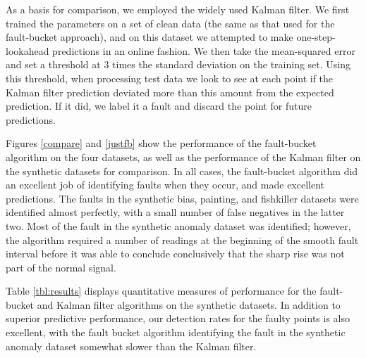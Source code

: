 \documentclass{article}
\begin{document}
As a basis for comparison, we employed the widely used Kalman
filter. We first trained the parameters on a set of clean data (the
same as that used for the fault-bucket approach), and on this dataset
we attempted to make one-step-lookahead predictions in an online
fashion. We then take the mean-squared error and set a threshold at 3
times the standard deviation on the training set. Using this
threshold, when processing test data we look to see at each point if
the Kalman filter prediction deviated more than this amount from the
expected prediction. If it did, we label it a fault and discard the
point for future predictions.

Figures \ref{compare} and \ref{justfb} show the performance of the
fault-bucket algorithm on the four datasets, as well as the
performance of the Kalman filter on the synthetic datasets for
comparison.  In all cases, the fault-bucket algorithm did an excellent
job of identifying faults when they occur, and made excellent
predictions.  The faults in the synthetic bias, painting,
and fishkiller datasets were identified almost perfectly, with a small
number of false negatives in the latter two.  Most of the fault in the
synthetic anomaly dataset was identified; however, the algorithm
required a number of readings at the beginning of the smooth fault
interval before it was able to conclude conclusively that the sharp
rise was not part of the normal signal.

Table \ref{tbl:results} displays quantitative measures of performance
for the fault-bucket and Kalman filter algorithms on the synthetic
datasets.  
In addition to superior predictive performance, our
detection rates for the faulty points is also excellent, with the
fault bucket algorithm identifying the fault in the synthetic anomaly
dataset somewhat slower than the Kalman filter.
\end{document}
